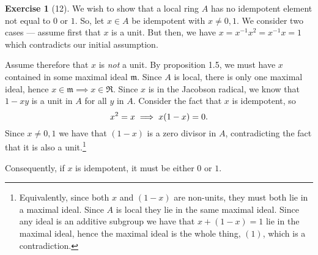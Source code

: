 \documentclass{article}
\theoremstyle{definition}
\newtheorem*{exercise}{Exercise}
\begin{document}
\begin{exercise}[12]
	We wish to show that a local ring $A$ has no idempotent element not
	equal to $0$ or $1$. So, let $x \in A$ be idempotent with $x \neq 0,
	1$. We consider two cases --- assume first that $x$ is a unit. But
	then, we have $x = x^{-1}x^2 = x^{-1}x = 1$ which contradicts our
	initial assumption.

	Assume therefore that $x$ is \emph{not} a unit. By proposition
	1.5, we must have $x$ contained in some maximal ideal
	$\mathfrak{m}$. Since $A$ is local, there is only one maximal
	ideal, hence $x \in \mathfrak{m} \implies x \in \mathfrak{R}$.
	Since $x$ is in the Jacobson radical, we know that $1 - xy$ is a
	unit in $A$ for all $y$ in $A$. Consider the fact that $x$ is
	idempotent, so
	\begin{equation}
		\notag
		x^2 = x \implies x(1 - x) = 0.
	\end{equation}
	Since $x \neq 0, 1$ we have that $(1 - x)$ is a zero divisor in
	$A$, contradicting the fact that it is also a
	unit.\footnote{Equivalently, since both $x$ and $(1 - x)$ are
		non-units, they must both lie in a maximal ideal. Since
		$A$ is local they lie in the same maximal ideal. Since any
	ideal is an additive subgroup we have that $x + (1 - x) = 1$ lie
in the maximal ideal, hence the maximal ideal is the whole thing, $(1)$,
which is a contradiction.}

	Consequently, if $x$ is idempotent, it must be either $0$ or $1$.
\end{exercise}
\end{document}
